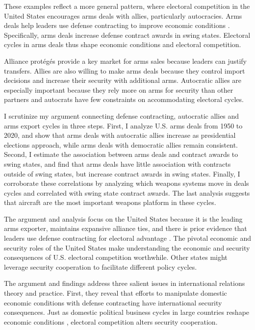\documentclass[12pt]{article}
\begin{document}
These examples reflect a more general pattern, where electoral competition in the United States encourages arms deals with allies, particularly autocracies.
Arms deals help leaders use defense contracting to improve economic conditions \citep{Tufte1978, Mintz1988, Mayer1995, DerouenHeo2000, Becker2021}. 
Specifically, arms deals increase defense contract awards in swing states. 
Electoral cycles in arms deals thus shape economic conditions and electoral competition. 


Alliance prot{\'e}g{\'e}s provide a key market for arms sales because leaders can justify transfers. 
Allies are also willing to make arms deals because they control import decisions and increase their security with additional arms. 
Autocratic allies are especially important because they rely more on arms for security than other partners \citep{McManusYarhi-Milo2017} and autocrats have few constraints on accommodating electoral cycles.


I scrutinize my argument connecting defense contracting, autocratic allies and arms export cycles in three steps. 
First, I analyze U.S. arms deals from 1950 to 2020, and show that arms deals with autocratic allies increase as presidential elections approach, while arms deals with democratic allies remain consistent. 
Second, I estimate the association between arms deals and contract awards to swing states, and find that arms deals have little association with contracts outside of swing states, but increase contract awards in swing states. 
Finally, I corroborate these correlations by analyzing which weapons systems move in deals cycles and correlated with swing state contract awards.
The last analysis suggests that aircraft are the most important weapons platform in these cycles. 


The argument and analysis focus on the United States because it is the leading arms exporter, maintains expansive alliance ties, and there is prior evidence that leaders use defense contracting for electoral advantage \citep{DerouenHeo2000}. 
The pivotal economic and security roles of the United States make understanding the economic and security consequences of U.S. electoral competition worthwhile.
Other states might leverage security cooperation to facilitate different policy cycles. 


The argument and findings address three salient issues in international relations theory and practice. 
First, they reveal that efforts to manipulate domestic economic conditions with defense contracting have international security consequences. 
Just as domestic political business cycles in large countries reshape economic conditions \citep{Kayser2006, Kayser2009}, electoral competition alters security cooperation. 
\end{document}
